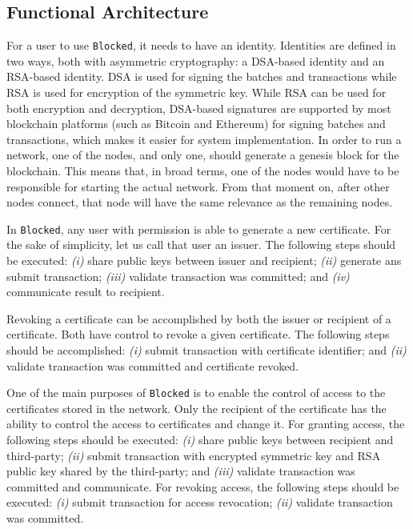 \subsection{Functional Architecture}
\label{sec:design-interaction}

For a user to use \texttt{Blocked}, it needs to have an identity. Identities are defined in two ways, both with asymmetric cryptography: a DSA-based identity and an RSA-based identity. DSA \cite{cameron_f._kerry_digital_2013} is used for signing the batches and transactions while RSA \cite{rivest_method_1978} is used for encryption of the symmetric key. While RSA \cite{rivest_method_1978} can be used for both encryption and decryption, DSA-based signatures are supported by most blockchain platforms (such as Bitcoin and Ethereum) for signing batches and transactions, which makes it easier for system implementation. In order to run a network, one of the nodes, and only one, should generate a genesis block for the blockchain. This means that, in broad terms, one of the nodes would have to be responsible for starting the actual network. From that moment on, after other nodes connect, that node will have the same relevance as the remaining nodes.

In \texttt{Blocked}, any user with permission is able to generate a new certificate. For the sake of simplicity, let us call that user an issuer. The following steps should be executed: \emph{(i)} share public keys between issuer and recipient; \emph{(ii)} generate ans submit transaction; \emph{(iii)} validate transaction was committed; and \emph{(iv)} communicate result to recipient.

Revoking a certificate can be accomplished by both the issuer or recipient of a certificate. Both have control to revoke a given certificate. The following steps should be accomplished: \emph{(i)} submit transaction with certificate identifier; and \emph{(ii)} validate transaction was committed and certificate revoked.

One of the main purposes of \texttt{Blocked} is to enable the control of access to the certificates stored in the network. Only the recipient of the certificate has the ability to control the access to certificates and change it. For granting access, the following steps should be executed: \emph{(i)} share public keys between recipient and third-party; \emph{(ii)} submit transaction with encrypted symmetric key and RSA public key shared by the third-party; and \emph{(iii)} validate transaction was committed and communicate. For revoking access, the following steps should be executed: \emph{(i)} submit transaction for access revocation; \emph{(ii)} validate transaction was committed.

